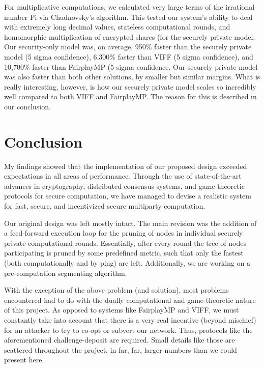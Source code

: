 \documentclass[journal]{IEEEtran}
\begin{document}
\par For multiplicative computations, we calculated very large terms of the irrational number Pi via Chudnovsky’s algorithm. This tested our system’s ability to deal with extremely long decimal values, stateless computational rounds, and homomorphic multiplication of encrypted shares (for the securely private model. Our security-only model was, on average, 950\% faster than the securely private model (5 sigma confidence), 6,300\% faster than VIFF (5 sigma confidence), and 10,700\% faster than FairplayMP (5 sigma confidence. Our securely private model was also faster than both other solutions, by smaller but similar margins. What is really interesting, however, is how our securely private model scales so incredibly well compared to both VIFF and FairplayMP. The reason for this is described in our conclusion.



\section{Conclusion}
\par My findings showed that the implementation of our proposed design exceeded expectations in all areas of performance. Through the use of state-of-the-art advances in cryptography, distributed consensus systems, and game-theoretic protocols for secure computation, we have managed to devise a realistic system for fast, secure, and incentivized secure multiparty computation. 

\par Our original design was left mostly intact. The main revision was the addition of a feed-forward execution loop for the pruning of nodes in individual securely private computational rounds. Essentially, after every round the tree of nodes participating is pruned by some predefined metric, such that only the fastest (both computationally and by ping) are left. Additionally, we are working on a pre-computation segmenting algorithm.

\par With the exception of the above problem (and solution), most problems encountered had to do with the dually computational and game-theoretic nature of this project. As opposed to systems like FairplayMP and VIFF, we must constantly take into account that there is a very real incentive (beyond mischief) for an attacker to try to co-opt or subvert our network. Thus, protocols like the aforementioned challenge-deposit are required. Small details like those are scattered throughout the project, in far, far, larger numbers than we could present here.
\end{document}
